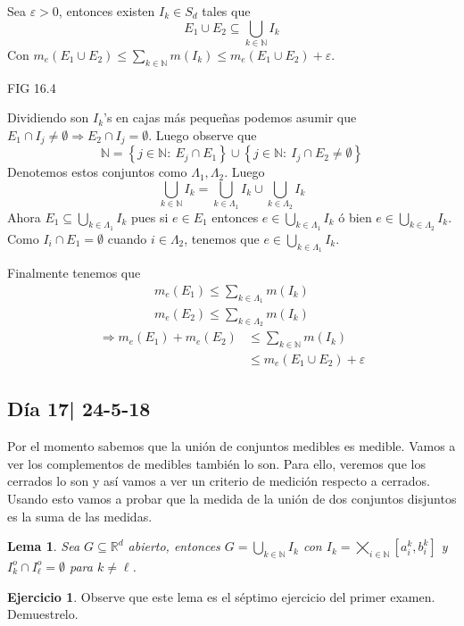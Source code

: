 \documentclass[12pt]{article}
\theoremstyle{plain}
\newtheorem{Lem}[Th]{Lema}             %
\theoremstyle{definition}
\newtheorem{Ej}[Th]{Ejercicio}
\theoremstyle{remark}
\numberwithin{equation}{section}
\newcommand{\bN}{\mathbb{N}}        %
\newcommand{\bR}{\mathbb{R}}        %
\renewcommand{\leq}{\leqslant}      %
\renewcommand{\:}{\colon}           %
\newcommand{\conj}[1]{\left\lbrace#1\right\rbrace}
\newcommand{\bonj}[1]{\left\lbrack#1\right\rbrack}
\begin{document}
\begin{multicols}{2}
\begin{ptcbp}
Sea $\varepsilon>0$, entonces existen $I_k\in S_d$ tales que
$$E_1\cup E_2\subseteq\bigcup_{k\in\bN}I_k$$
Con $m_e(E_1\cup E_2)\leq\sum_{k\in\bN}m(I_k)\leq m_e(E_1\cup E_2)+\varepsilon$.\par
FIG 16.4\par
Dividiendo son $I_k$'s en cajas más pequeñas podemos asumir que $E_1\cap I_j\neq\emptyset\Rightarrow E_2\cap I_j=\emptyset$. Luego observe que
$$\bN=\conj{j\in\bN\:\ E_j\cap E_1}\cup\conj{j\in\bN\:\ I_j\cap E_2\neq\emptyset}$$
Denotemos estos conjuntos como $\Lambda_1, \Lambda_2$. Luego
$$\bigcup_{k\in\bN}I_k=\bigcup_{k\in\Lambda_1}I_k\cup\bigcup_{k\in\Lambda_2}I_k $$
Ahora $E_1\subseteq\bigcup_{k\in\Lambda_1}I_k$ pues si $e\in E_1$ entonces $e\in \bigcup_{k\in\Lambda_1}I_k$ ó bien $e\in \bigcup_{k\in\Lambda_2}I_k$. Como $I_i\cap E_1=\emptyset$ cuando $i\in\Lambda_2$, tenemos que $e\in\bigcup_{k\in\Lambda_1}I_k$.\par
Finalmente tenemos que
\begin{gather*}
  m_e(E_1)\leq \sum_{k\in\Lambda_1}m(I_k)\\
  m_e(E_2)\leq \sum_{k\in\Lambda_2}m(I_k)
\end{gather*}
\begin{align*}
  \Rightarrow m_e(E_1)+m_e(E_2) & \leq \sum_{k\in\bN} m(I_k)\\
&\leq m_e(E_1\cup E_2)+\varepsilon
\end{align*}
\end{ptcbp}

\subsection{Día 17| 24-5-18}

Por el momento sabemos que la unión de conjuntos medibles es medible. Vamos a ver los complementos de medibles también lo son. Para ello, veremos que los cerrados lo son y así vamos a ver un criterio de medición respecto a cerrados. Usando esto vamos a probar que la medida de la unión de dos conjuntos disjuntos es la suma de las medidas.

\begin{Lem}\label{ej:parcial1I2018Ej7}
  Sea $G\subseteq\bR^d$ abierto, entonces $G=\bigcup_{k\in\bN}I_k$ con $I_k=\bigtimes_{i\in\bN}\bonj{a_i^k,b_i^k}$ y $I_k^o\cap I_\ell^o=\emptyset$ para $k\neq\ell$.
\end{Lem}

\begin{Ej}
  Observe que este lema es el séptimo ejercicio del primer examen. Demuestrelo.
\end{Ej}


\end{multicols}
\end{document}
